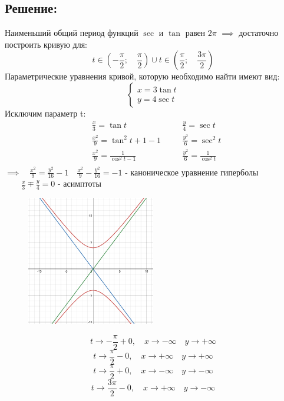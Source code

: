 \documentclass{article}
\begin{document}
	\subsection{Решение:}
         Наименьший общий период функций $\sec$ и $\tan$ равен $2\pi$ $\implies$ достаточно построить кривую для: $$t \in (-\frac{\pi}{2};\quad \frac{\pi}{2})\cup t \in (\frac{\pi}{2};\quad \frac{3\pi}{2})$$
        Параметрические уравнения кривой, которую необходимо найти имеют вид:\\
        \[
        \begin{cases}
        x = 3\tan{t} \\
        y = 4\sec{t}
        \end{cases}
        \]
        Исключим параметр t:\\
        \[
        \begin{aligned}
        & \frac{x}{3} = \tan{t} & \quad & \frac{y}{4} = \sec{t} \\
        & \frac{x^2}{9} = \tan^2{t} + 1 - 1 & \quad & \frac{y^2}{6} = \sec^2{t} \\
        & \frac{x^2}{9} = \frac{1}{\cos^2{t} - 1} & \quad & \frac{y^2}{6} = \frac{1}{\cos^2{t}} \\
        \end{aligned}
        \]
        $\implies \quad \frac{x^2}{9} = \frac{y^2}{16} - 1  \quad \frac{x^2}{9} - \frac{y^2}{16} = -1$ - каноническое уравнение гиперболы $\quad\quad \frac{x}{3} \mp \frac{y}{4} = 0$ - асимптоты \\
         \begin{figure}[h]
            \centering
            \includegraphics[width=0.5\textwidth]{gr_2.png}
            \label{fig:my_label}
        \end{figure}
        $$t \rightarrow  -\frac{\pi}{2} + 0, \quad x \rightarrow -\infty \quad y \rightarrow +\infty$$
        $$t \rightarrow  \frac{\pi}{2} - 0, \quad x \rightarrow +\infty \quad y \rightarrow +\infty$$
        $$t \rightarrow  \frac{\pi}{2} + 0, \quad x \rightarrow -\infty \quad y \rightarrow -\infty$$
        $$t \rightarrow  \frac{3\pi}{2} -  0, \quad x \rightarrow +\infty \quad y \rightarrow -\infty$$
\end{document}
